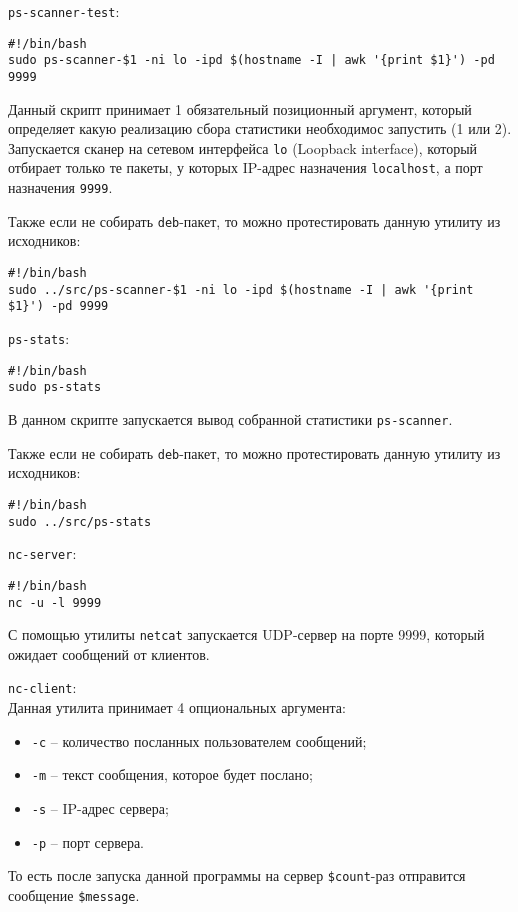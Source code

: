 \linespace

\verb|ps-scanner-test|:
\begin{lstlisting}
#!/bin/bash
sudo ps-scanner-$1 -ni lo -ipd $(hostname -I | awk '{print $1}') -pd 9999
\end{lstlisting}
Данный скрипт принимает 1 обязательный позиционный аргумент, который определяет какую реализацию сбора статистики необходимос запустить (1 или 2). Запускается сканер на сетевом интерфейса \verb|lo| (Loopback interface), который отбирает только те пакеты, у которых IP-адрес назначения \verb|localhost|, а порт назначения \verb|9999|.

\linespace

Также если не собирать \verb|deb|-пакет, то можно протестировать данную утилиту из исходников:
\begin{lstlisting}
#!/bin/bash
sudo ../src/ps-scanner-$1 -ni lo -ipd $(hostname -I | awk '{print $1}') -pd 9999
\end{lstlisting}

\linespace

\verb|ps-stats|:
\begin{lstlisting}
#!/bin/bash
sudo ps-stats
\end{lstlisting}
В данном скрипте запускается вывод собранной статистики \verb|ps-scanner|.

\newpage

Также если не собирать \verb|deb|-пакет, то можно протестировать данную утилиту из исходников:
\begin{lstlisting}
#!/bin/bash
sudo ../src/ps-stats
\end{lstlisting}

\linespace

\verb|nc-server|:
\begin{lstlisting}
#!/bin/bash
nc -u -l 9999
\end{lstlisting}
С помощью утилиты \verb|netcat| запускается UDP-сервер на порте 9999, который ожидает сообщений от клиентов.

\linespace

\verb|nc-client|:\\
Данная утилита принимает 4 опциональных аргумента:
\begin{itemize}
    \item \verb|-c| -- количество посланных пользователем сообщений;
    \item \verb|-m| -- текст сообщения, которое будет послано;
    \item \verb|-s| -- IP-адрес сервера;
    \item \verb|-p| -- порт сервера.
\end{itemize}
То есть после запуска данной программы на сервер \verb|$count|-раз отправится сообщение \verb|$message|.

